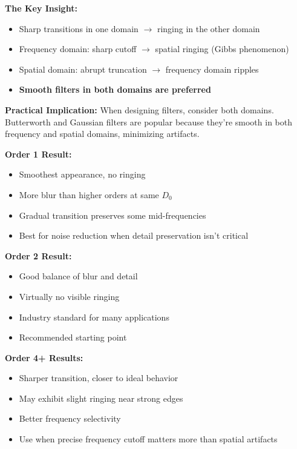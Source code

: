 \documentclass[12pt,a4paper]{article}
\begin{document}
\begin{deepexplanation}
\textbf{The Key Insight:}
\begin{itemize}
    \item Sharp transitions in one domain $\rightarrow$ ringing in the other domain
    \item Frequency domain: sharp cutoff $\rightarrow$ spatial ringing (Gibbs phenomenon)
    \item Spatial domain: abrupt truncation $\rightarrow$ frequency domain ripples
    \item \textbf{Smooth filters in both domains are preferred}
\end{itemize}

\textbf{Practical Implication:}
When designing filters, consider both domains. Butterworth and Gaussian filters are popular because they're smooth in both frequency and spatial domains, minimizing artifacts.
\end{deepexplanation}

\textbf{Order 1 Result:}
\begin{itemize}
    \item Smoothest appearance, no ringing
    \item More blur than higher orders at same $D_0$
    \item Gradual transition preserves some mid-frequencies
    \item Best for noise reduction when detail preservation isn't critical
\end{itemize}

\textbf{Order 2 Result:}
\begin{itemize}
    \item Good balance of blur and detail
    \item Virtually no visible ringing
    \item Industry standard for many applications
    \item Recommended starting point
\end{itemize}

\textbf{Order 4+ Results:}
\begin{itemize}
    \item Sharper transition, closer to ideal behavior
    \item May exhibit slight ringing near strong edges
    \item Better frequency selectivity
    \item Use when precise frequency cutoff matters more than spatial artifacts
\end{itemize}
\end{document}

